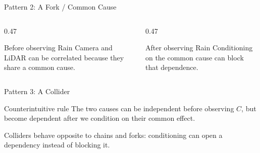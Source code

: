 \documentclass[aspectratio=169,10pt]{beamer}
\begin{document}
\begin{frame}[shrink=10]{Pattern 2: A Fork / Common Cause}
  \begin{center}
  \end{center}

  \begin{columns}[T,onlytextwidth]
    \begin{column}{0.47\textwidth}
      \begin{block}{Before observing Rain}
        Camera and LiDAR can be correlated because they share a common cause.
      \end{block}
    \end{column}
    \begin{column}{0.47\textwidth}
      \begin{block}{After observing Rain}
        Conditioning on the common cause can block that dependence.
      \end{block}
    \end{column}
  \end{columns}
\end{frame}

\begin{frame}[shrink=10]{Pattern 3: A Collider}
  \begin{center}
  \end{center}

  \begin{block}{Counterintuitive rule}
    The two causes can be independent before observing $C$, but become dependent after we condition on their common effect.
  \end{block}

  \begin{keyidea}
    Colliders behave opposite to chains and forks: conditioning can open a dependency instead of blocking it.
  \end{keyidea}
\end{frame}
\end{document}
